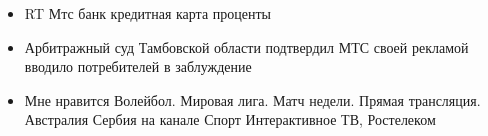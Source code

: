 \begin{itemize}
    \item RT Мтс банк кредитная карта проценты
    \item Арбитражный суд Тамбовской области подтвердил МТС своей рекламой вводило потребителей в заблуждение
    \item Мне нравится Волейбол. Мировая лига. Матч недели. Прямая трансляция. Австралия Сербия на канале Спорт Интерактивное ТВ, Ростелеком
\end{itemize}